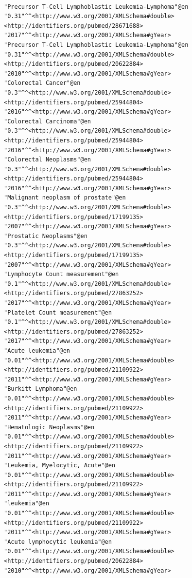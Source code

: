 \documentclass[runningheads]{llncs}
\begin{document}
\begin{figure}[!t]
\begin{scriptsize}
\begin{verbatim}

"Precursor T-Cell Lymphoblastic Leukemia-Lymphoma"@en	"0.31"^^<http://www.w3.org/2001/XMLSchema#double>	<http://identifiers.org/pubmed/28671688>	"2017"^^<http://www.w3.org/2001/XMLSchema#gYear>
"Precursor T-Cell Lymphoblastic Leukemia-Lymphoma"@en	"0.31"^^<http://www.w3.org/2001/XMLSchema#double>	<http://identifiers.org/pubmed/20622884>	"2010"^^<http://www.w3.org/2001/XMLSchema#gYear>
"Colorectal Cancer"@en	"0.3"^^<http://www.w3.org/2001/XMLSchema#double>	<http://identifiers.org/pubmed/25944804>	"2016"^^<http://www.w3.org/2001/XMLSchema#gYear>
"Colorectal Carcinoma"@en	"0.3"^^<http://www.w3.org/2001/XMLSchema#double>	<http://identifiers.org/pubmed/25944804>	"2016"^^<http://www.w3.org/2001/XMLSchema#gYear>
"Colorectal Neoplasms"@en	"0.3"^^<http://www.w3.org/2001/XMLSchema#double>	<http://identifiers.org/pubmed/25944804>	"2016"^^<http://www.w3.org/2001/XMLSchema#gYear>
"Malignant neoplasm of prostate"@en	"0.3"^^<http://www.w3.org/2001/XMLSchema#double>	<http://identifiers.org/pubmed/17199135>	"2007"^^<http://www.w3.org/2001/XMLSchema#gYear>
"Prostatic Neoplasms"@en	"0.3"^^<http://www.w3.org/2001/XMLSchema#double>	<http://identifiers.org/pubmed/17199135>	"2007"^^<http://www.w3.org/2001/XMLSchema#gYear>
"Lymphocyte Count measurement"@en	"0.1"^^<http://www.w3.org/2001/XMLSchema#double>	<http://identifiers.org/pubmed/27863252>	"2017"^^<http://www.w3.org/2001/XMLSchema#gYear>
"Platelet Count measurement"@en	"0.1"^^<http://www.w3.org/2001/XMLSchema#double>	<http://identifiers.org/pubmed/27863252>	"2017"^^<http://www.w3.org/2001/XMLSchema#gYear>
"Acute leukemia"@en	"0.01"^^<http://www.w3.org/2001/XMLSchema#double>	<http://identifiers.org/pubmed/21109922>	"2011"^^<http://www.w3.org/2001/XMLSchema#gYear>
"Burkitt Lymphoma"@en	"0.01"^^<http://www.w3.org/2001/XMLSchema#double>	<http://identifiers.org/pubmed/21109922>	"2011"^^<http://www.w3.org/2001/XMLSchema#gYear>
"Hematologic Neoplasms"@en	"0.01"^^<http://www.w3.org/2001/XMLSchema#double>	<http://identifiers.org/pubmed/21109922>	"2011"^^<http://www.w3.org/2001/XMLSchema#gYear>
"Leukemia, Myelocytic, Acute"@en	"0.01"^^<http://www.w3.org/2001/XMLSchema#double>	<http://identifiers.org/pubmed/21109922>	"2011"^^<http://www.w3.org/2001/XMLSchema#gYear>
"leukemia"@en	"0.01"^^<http://www.w3.org/2001/XMLSchema#double>	<http://identifiers.org/pubmed/21109922>	"2011"^^<http://www.w3.org/2001/XMLSchema#gYear>
"Acute lymphocytic leukemia"@en	"0.01"^^<http://www.w3.org/2001/XMLSchema#double>	<http://identifiers.org/pubmed/20622884>	"2010"^^<http://www.w3.org/2001/XMLSchema#gYear>

\end{verbatim}
\end{scriptsize}
\end{figure}
\end{document}
